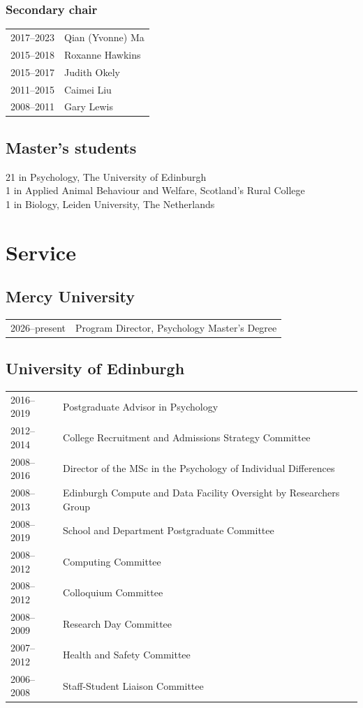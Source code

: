 \documentclass[11pt]{article}
\begin{document}
\subsubsection*{Secondary chair}
\begin{tabular}{p{3cm}p{12cm}}
  2017--2023 & Qian (Yvonne) Ma \\
  2015--2018 & Roxanne Hawkins \\
  2015--2017 & Judith Okely \\
  2011--2015 & Caimei Liu \\
  2008--2011 & Gary Lewis
\end{tabular}

\subsection*{Master's students}
21 in Psychology, The University of Edinburgh \\
1 in Applied Animal Behaviour and Welfare, Scotland's Rural College \\
1 in Biology, Leiden University, The Netherlands

\section*{Service}

\subsection*{Mercy University}
\begin{tabular}{p{3cm}p{12cm}}
2026--present & Program Director, Psychology Master's Degree 
\end{tabular}


\subsection*{University of Edinburgh}
\begin{tabular}{p{3cm}p{12cm}}
  2016--2019 & Postgraduate Advisor in Psychology \\
  2012--2014 & College Recruitment and Admissions Strategy Committee \\
  2008--2016 & Director of the MSc in the Psychology of Individual
               Differences \\
  2008--2013 & Edinburgh Compute and Data Facility Oversight by
               Researchers Group \\
  2008--2019 & School and Department Postgraduate Committee \\
  2008--2012 & Computing Committee \\
  2008--2012 & Colloquium Committee \\
  2008--2009 & Research Day Committee \\
  2007--2012 & Health and Safety Committee \\
  2006--2008 & Staff-Student Liaison Committee
\end{tabular}
\end{document}

